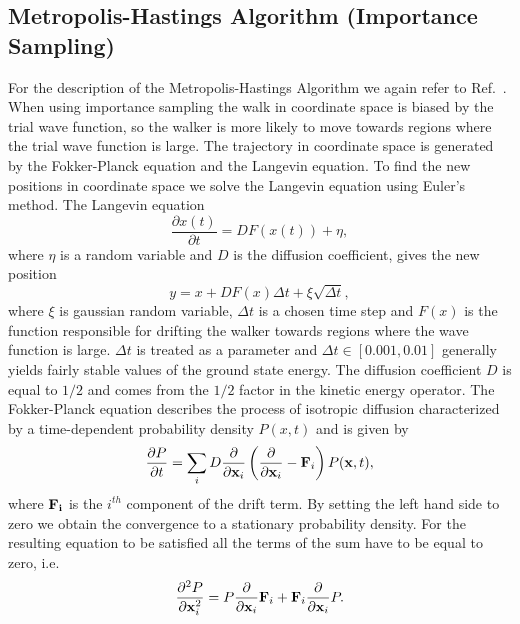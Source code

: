 \documentclass[../main.tex]{subfiles}
\begin{document}
\subsection{Metropolis-Hastings Algorithm (Importance Sampling)}

For the description of the Metropolis-Hastings Algorithm we again refer to Ref.~\cite{FYS4411-LectureNotes}.
When using importance sampling the walk in coordinate space is biased by the trial wave function, so the walker is more likely to move towards regions where the trial wave function is large. The trajectory in coordinate space is generated by the Fokker-Planck equation and the Langevin equation. To find the new positions in coordinate space we solve the Langevin equation using Euler's method. The Langevin equation
\begin{equation}\label{Langevin}
 \frac{\partial x(t)}{\partial t} = D F(x(t)) + \eta,
\end{equation}
where $\eta$ is a random variable and $D$ is the diffusion coefficient, gives the new position
\begin{equation}\label{eq: LangevinSolution}
 y = x + DF(x)\Delta t + \xi \sqrt{\Delta t},
\end{equation}
where $\xi$ is gaussian random variable, $\Delta t$ is a chosen time step and $F(x)$ is the function responsible for drifting the walker towards regions where the wave function is large. $\Delta t$ is treated as a parameter and $\Delta t \in [0.001, 0.01]$ generally yields fairly stable values of the ground state energy. The diffusion coefficient $D$ is equal to $1/2$ and comes from the $1/2$ factor in the kinetic energy operator. The Fokker-Planck equation describes the process of isotropic diffusion characterized by a time-dependent probability density $P(x, t)$ and is given by
\begin{equation}
 \frac{\partial P}{\partial t} = \sum_i D \frac{\partial}{\partial {\bf x}_i}\left( \frac{\partial}{\partial {\bf x}_i} - {\bf F}_i \right) P({\bf x}, t),
\end{equation}
where $\bf{F}_i$ is the $i^{th}$ component of the drift term. By setting the left hand side to zero we obtain the convergence to a stationary probability density. For the resulting equation to be satisfied all the terms of the sum have to be equal to zero, i.e.
\begin{equation}\label{stationaryFokker}
 \frac{\partial^2 P}{\partial {\bf x}_i^2} = P \frac{\partial}{\partial {\bf x}_i} {\bf F}_i
 + {\bf F}_i \frac{\partial}{\partial {\bf x}_i} P.
\end{equation}
\end{document}
